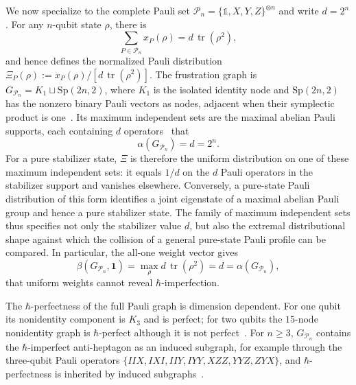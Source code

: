 \documentclass[10pt,aps,pra,twocolumn,floatfix,nofootinbib,superscriptaddress,longbibliography]{revtex4-2}
\newcommand{\Pcal}{\mathcal P}
\renewcommand{\tr}{\operatorname{tr}}
\providecommand{\mathbm}[1]{\bm{#1}}
\begin{document}
\begin{bibunit}[apsrev4-2]
		We now specialize to the complete Pauli set $\Pcal_n=\{\mathbb{1},X,Y,Z\}^{\otimes n}$ and write $d=2^n$.
		For any $n$-qubit state $\rho$, there is
		\begin{equation}
			\sum_{P\in\Pcal_n}x_P(\rho)=d\,\tr(\rho^2),
			\label{eq:parseval}
		\end{equation}
		and hence defines the normalized Pauli distribution $\Xi_P(\rho):=x_P(\rho)/[d\,\tr(\rho^2)]$.
		The frustration graph is $G_{\Pcal_n}=K_1\sqcup\mathrm{Sp}(2n,2)$, where $K_1$ is the isolated identity node and $\mathrm{Sp}(2n,2)$ has the nonzero binary Pauli vectors as nodes, adjacent when their symplectic product is one~\cite{brouwer2012spectra}.
		Its maximum independent sets are the maximal abelian Pauli supports, each containing $d$ operators~\cite{sarkar2021sets} that 
		\begin{equation}
			\alpha(G_{\Pcal_n})=d=2^n.
			\label{eq:alpha-full}
		\end{equation}
		For a pure stabilizer state, $\Xi$ is therefore the uniform distribution on one of these maximum independent sets: it equals $1/d$ on the $d$ Pauli operators in the stabilizer support and vanishes elsewhere. Conversely, a pure-state Pauli distribution of this form identifies a joint eigenstate of a maximal abelian Pauli group and hence a pure stabilizer state. The family of maximum independent sets thus specifies not only the stabilizer value $d$, but also the extremal distributional shape against which the collision of a general pure-state Pauli profile can be compared.
		In particular, the all-one weight vector gives
		\begin{equation}
			\beta(G_{\Pcal_n},\mathbm{1})=\max_\rho d\,\tr(\rho^2)=d=\alpha(G_{\Pcal_n}),
			\label{eq:beta-uniform-full}
		\end{equation}
		that uniform weights cannot reveal $\hbar$-imperfection.
		
		The $\hbar$-perfectness of the full Pauli graph is dimension dependent.
		For one qubit its nonidentity component is $K_3$ and is perfect; for two qubits the $15$-node nonidentity graph is $\hbar$-perfect although it is not perfect~\cite{xu2025simultaneous}.
		For $n\ge3$, $G_{\Pcal_n}$ contains the $\hbar$-imperfect anti-heptagon as an induced subgraph, for example through the three-qubit Pauli operators $\{IIX,IXI,IIY,IYY,XZZ,YYZ,ZYX\}$, and $\hbar$-perfectness is inherited by induced subgraphs~\cite{xu2024bounding,xu2025simultaneous}.
		

\end{bibunit}
\end{document}
